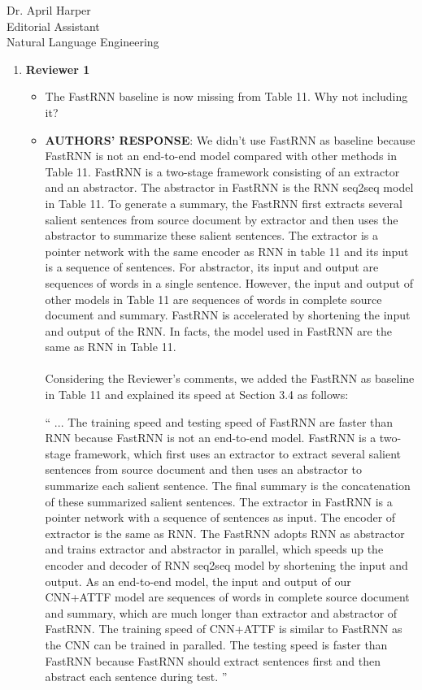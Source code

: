 \documentclass[11pt]{letter} %
\theoremstyle{definition}
\begin{document}
\begin{letter}{Dr. April Harper \\
            Editorial Assistant \\
			Natural Language Engineering}
		\flushleft
		\begin{enumerate}
		    \item \textbf{Reviewer 1}

			\begin{itemize}
				\item The FastRNN baseline is now missing from Table 11. Why not including it?
				

				\item[] \textbf{AUTHORS' RESPONSE}: 
				We didn't use FastRNN as baseline because FastRNN is not an end-to-end model compared with other methods in Table 11.
				FastRNN is a two-stage framework consisting of an extractor and an abstractor. The abstractor in FastRNN is the RNN seq2seq model in Table 11. To generate a summary, the FastRNN first extracts several salient sentences from source document by extractor and then uses the abstractor to summarize these salient sentences. The extractor is a pointer network with the same encoder as RNN in table 11 and its input is a sequence of sentences. For abstractor, its input and output are sequences of words in a single sentence. However, the input and output of other models in Table 11 are sequences of words in complete source document and summary. FastRNN is accelerated by shortening the input and output of the RNN. In facts, the model used in FastRNN are the same as RNN in Table 11.
				\\ \hspace*{\fill} \\
				Considering the Reviewer's comments, we added the FastRNN as baseline in Table 11 and explained its speed at Section 3.4 as follows:
				
				``
				... The training speed and testing speed of FastRNN are faster than RNN
				because FastRNN is not an end-to-end model. FastRNN is a two-stage framework, which first uses an extractor to extract several salient sentences from source document and then uses an abstractor to summarize each salient sentence. The final summary is the concatenation of these summarized salient sentences. The extractor in FastRNN is a pointer network with a sequence of sentences as input. The encoder of extractor is the same as RNN. The FastRNN adopts RNN as abstractor and trains extractor and abstractor in parallel, which speeds up the encoder and decoder of RNN seq2seq model by shortening the input and output. As an end-to-end model, the input and output of our CNN+ATTF model are sequences of words in complete source document and summary, which are much longer than extractor and abstractor of FastRNN. The training speed of CNN+ATTF is similar to FastRNN as the CNN can be trained in paralled. The testing speed is faster than FastRNN because FastRNN should extract sentences first and then abstract each sentence during test.
				''


\end{itemize}
\end{enumerate}
\end{letter}
\end{document}
